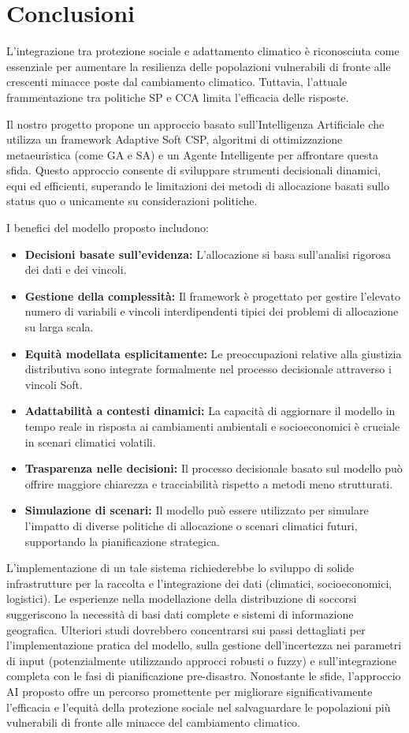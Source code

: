 \documentclass[letterpaper]{article}
\begin{document}
\section{Conclusioni}
L'integrazione tra protezione sociale e adattamento climatico è riconosciuta come essenziale per aumentare la resilienza delle popolazioni vulnerabili di fronte alle crescenti minacce poste dal cambiamento climatico. Tuttavia, l'attuale frammentazione tra politiche SP e CCA limita l'efficacia delle risposte.

Il nostro progetto propone un approccio basato sull'Intelligenza Artificiale che utilizza un framework Adaptive Soft CSP, algoritmi di ottimizzazione metaeuristica (come GA e SA) e un Agente Intelligente per affrontare questa sfida. Questo approccio consente di sviluppare strumenti decisionali dinamici, equi ed efficienti, superando le limitazioni dei metodi di allocazione basati sullo status quo o unicamente su considerazioni politiche.

I benefici del modello proposto includono:
\begin{itemize}
    \item \textbf{Decisioni basate sull'evidenza:} L'allocazione si basa sull'analisi rigorosa dei dati e dei vincoli.
    \item \textbf{Gestione della complessità:} Il framework è progettato per gestire l'elevato numero di variabili e vincoli interdipendenti tipici dei problemi di allocazione su larga scala.
    \item \textbf{Equità modellata esplicitamente:} Le preoccupazioni relative alla giustizia distributiva sono integrate formalmente nel processo decisionale attraverso i vincoli Soft.
    \item \textbf{Adattabilità a contesti dinamici:} La capacità di aggiornare il modello in tempo reale in risposta ai cambiamenti ambientali e socioeconomici è cruciale in scenari climatici volatili.
    \item \textbf{Trasparenza nelle decisioni:} Il processo decisionale basato sul modello può offrire maggiore chiarezza e tracciabilità rispetto a metodi meno strutturati.
    \item \textbf{Simulazione di scenari:} Il modello può essere utilizzato per simulare l'impatto di diverse politiche di allocazione o scenari climatici futuri, supportando la pianificazione strategica.
\end{itemize}

L'implementazione di un tale sistema richiederebbe lo sviluppo di solide infrastrutture per la raccolta e l'integrazione dei dati (climatici, socioeconomici, logistici). Le esperienze nella modellazione della distribuzione di soccorsi suggeriscono la necessità di basi dati complete e sistemi di informazione geografica. Ulteriori studi dovrebbero concentrarsi sui passi dettagliati per l'implementazione pratica del modello, sulla gestione dell'incertezza nei parametri di input (potenzialmente utilizzando approcci robusti o fuzzy) e sull'integrazione completa con le fasi di pianificazione pre-disastro. Nonostante le sfide, l'approccio AI proposto offre un percorso promettente per migliorare significativamente l'efficacia e l'equità della protezione sociale nel salvaguardare le popolazioni più vulnerabili di fronte alle minacce del cambiamento climatico.
\end{document}
